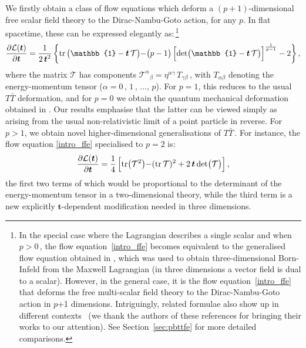 \documentclass[11pt]{article}
\newcommand{\be}{\begin{equation}}
\newcommand{\ee}{\end{equation}}
\newcommand{\CL}{\mathcal{L}}
\newcommand{\CT}{\mathcal{T}}
\newcommand{\p}{\partial}
\newcommand{\tr}{\text{tr}}
\newcommand{\lambdap}{\boldsymbol{t}}
\begin{document}
We firstly obtain a class of flow equations which deform a $(p+1)$-dimensional free scalar field theory to the Dirac-Nambu-Goto action, for any $p$. In flat spacetime, these can be expressed elegantly as:\,\footnote{In the special case where the Lagrangian describes a single scalar and when $p > 0$\,, the flow equation~\eqref{intro_ffe} becomes equivalent to the generalised flow equation obtained in \cite{Ferko:2023sps}, which was used to obtain three-dimensional Born-Infeld from the Maxwell Lagrangian (in three dimensions a vector field is dual to a scalar). However, in the general case, it is the flow equation~\eqref{intro_ffe} that deforms the free multi-scalar field theory to the Dirac-Nambu-Goto action in $p$+1 dimensions. Intriguingly, related formulae also show up in different contexts~\cite{Morone:2024ffm, Tsolakidis:2024wut} (we thank the authors of these references for bringing their works to our attention). See Section~\ref{sec:pbttfe} for more detailed comparisons.}
%
\be \label{intro_ffe}
    \frac{\p \CL(\lambdap)}{\p \lambdap} = \frac{1}{2 \, \lambdap^2} \, \biggl\{ \tr \, \bigl(\mathbb{1} - \lambdap\, \CT\bigl)  - \bigl(p-1\bigr) \, \Bigl[ \det \bigl(\mathbb{1} - \lambdap\, \CT \bigr)\Bigr]^{\frac{1}{p-1}} - 2 \biggr\}\,,
\ee
%
where the matrix $\mathcal{T}$ 
has components $\mathcal{T}^\alpha{}_\beta = \eta^{\alpha \gamma} \, T_{\gamma \beta}$\,, with $T_{\alpha \beta}$ denoting the energy-momentum tensor ($\alpha=0\,,\,1\,,\,\dots,\,p$).
For $p=1$, this reduces to the usual $T \bar T$ deformation, and for $p=0$ we obtain the quantum mechanical deformation obtained in \cite{Gross:2019ach}. Our results emphasise that the latter can be viewed simply as arising from the usual non-relativistic limit of a point particle in reverse. 
For $p>1$, we obtain novel higher-dimensional generalisations of $T \bar T$\,.
For instance, the flow equation \eqref{intro_ffe} specialised to $p=2$ is:
%
\be
\frac{\partial \mathcal{L}(\lambdap)}{\partial \lambdap} = 
\frac{1}{4} \, \Bigl[ \tr\bigl(\mathcal{T}^2\bigl)-(\tr \,\mathcal{T})^2 + 2\, \lambdap \det \bigl( \mathcal{T} \bigr) \Bigr]\,,
\label{intro_membraneTTbar}
\ee
%
the first two terms of which would be proportional to the determinant of the energy-momentum tensor in a two-dimensional theory, while the third term is a new explicitly $\lambdap$-dependent modification needed in three dimensions. 
\end{document}
